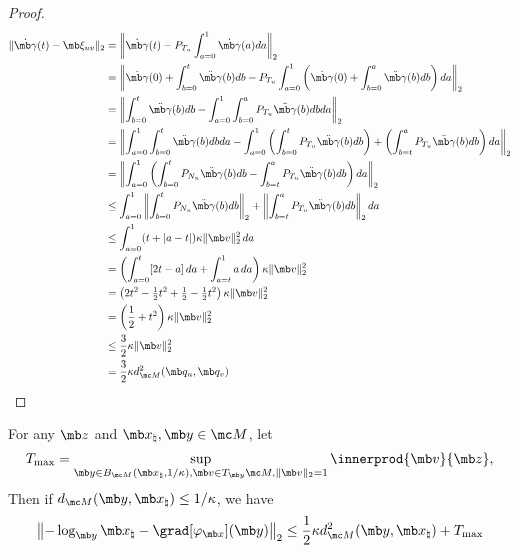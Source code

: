 {\begin{proof}
    \begin{equation}
        \begin{aligned}
            \|\dot{\mb\gamma}(t)-\mb\xi_{uv}\|_2
            &= \left\| \dot{\mb\gamma}(t) -  P_{T_u} \int_{a=0}^1 \dot{\mb\gamma}(a) da \right\|_2\\
            &=\left\| \dot{\mb\gamma}(0) + \int_{b=0}^t \Ddot{\mb\gamma}(b)db -  P_{T_u} \int_{a=0}^1 \left(\dot{\mb\gamma}(0) + \int_{b=0}^a \Ddot{\mb\gamma}(b)db \right)da  \right\|_2\\
            &=\left\| \int_{b=0}^t \Ddot{\mb\gamma}(b)db -  \int_{a=0}^1 \int_{b=0}^a P_{T_u} \Ddot{\mb\gamma}(b)dbda\right\|_2\\
            &= \left\| \int_{a=0}^1 \int_{b=0}^t \Ddot{\mb\gamma}(b)db da - \int_{a=0}^1 \left(\int_{b=0}^t P_{T_u} \Ddot{\mb\gamma}(b)db\right) + \left( \int_{b=t}^a P_{T_u} \Ddot{\mb\gamma}(b)db\right)da\right\|_2\\
            &=\left\|\int_{a=0}^1 \left( \int_{b=0}^t P_{N_u}\Ddot{\mb\gamma}(b)db - \int_{b=t}^a P_{T_u} \Ddot{\mb\gamma}(b)db\right)da\right\|_2\\
            &\leq \int_{a=0}^1 \left\| \int_{b=0}^t P_{N_u}\Ddot{\mb\gamma}(b)db \right\|_2 + \left\|\int_{b=t}^a P_{T_u} \Ddot{\mb\gamma}(b)db\right\|_2 da \\
            &\leq \int_{a=0}^1 (t+|a - t|)\kappa \|\mb v\|_2^2 \, da\\
            &= \left(  \int_{a = 0}^t [ 2t - a ] \, da + \int_{a = t}^1 a \, da \right) \kappa \|\mb v\|_2^2 \\
            &= \left( 2 t^2 - \tfrac{1}{2} t^2 + \tfrac{1}{2} - \tfrac{1}{2} t^2 \right) \kappa \|\mb v\|_2^2  \\
            &= \left(\frac{1}{2} + t^2 \right) \kappa \|\mb v\|_2^2 \\ 
            &\le \frac{3}{2} \kappa \|\mb v\|_2^2\\
            &=\frac{3}{2} \kappa d_{\mc M}^2(\mb q_u, \mb q_v)
        \end{aligned}
    \end{equation}
\end{proof}
}




\begin{lemma}\label{lemma:log-grad-comparison}
    For any $\mb z$ and $\mb x_\natural, \mb y \in \mc M$, let
\begin{equation}
    T_{\max} = \sup_{\mb y \in B_{\mc M}(\mb x_\natural, 1/\kappa), \mb v \in T_{\mb y } \mc M, \| \mb v \|_2 =1} \innerprod{\mb v}{\mb z},
\end{equation}
Then if $d_{\mc M}(\mb y, \mb x_\natural ) \le 1/\kappa$, we have 
    \begin{equation}
        \left\|-\log_{\mb y}\mb x_\natural - \grad[\varphi_{\mb x}](\mb y)\right\|_2 \leq 
        \frac{1}{2} \kappa d_{\mc M}^2 (\mb y, \mb x_\natural) + T_{\max}
    \end{equation}
\end{lemma}


